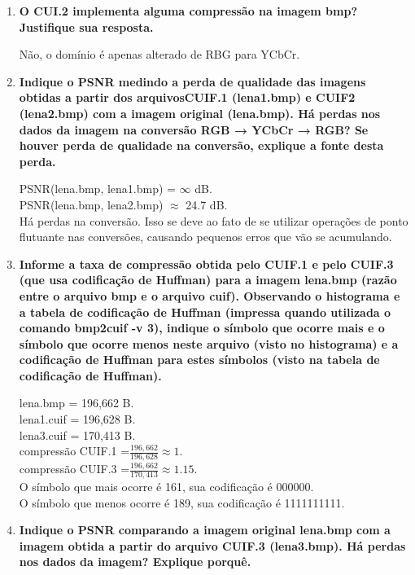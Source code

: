 \documentclass[12pt, a4paper, oneside]{abntex2}
\begin{document}
    \printcoverufsc

    \begin{enumerate}
        \item \textbf{O CUI.2 implementa alguma compressão na imagem bmp?
                Justifique sua resposta.}

                Não, o domínio é apenas alterado de RBG para YCbCr.

        \item \textbf{Indique o PSNR medindo a perda de qualidade das imagens obtidas a partir dos arquivosCUIF.1 (lena1.bmp) e CUIF2 (lena2.bmp) com a imagem original (lena.bmp).
        Há perdas nos dados da imagem na conversão RGB → YCbCr → RGB? Se houver perda de qualidade na conversão, explique a fonte desta perda.}

                PSNR(lena.bmp, lena1.bmp) = $\infty$ dB. \\
                PSNR(lena.bmp, lena2.bmp) $\approx$ 24.7 dB. \\
                Há perdas na conversão.
                Isso se deve ao fato de se utilizar operações de ponto flutuante nas conversões, causando pequenos erros que vão se acumulando.

        \item \textbf{Informe a taxa de compressão obtida pelo CUIF.1 e pelo CUIF.3 (que usa codificação de Huffman) para a imagem lena.bmp (razão entre o arquivo bmp e o arquivo cuif).
        Observando o histograma e a tabela de codificação de Huffman (impressa quando utilizada o comando bmp2cuif -v 3), indique o símbolo que ocorre mais e o símbolo que ocorre menos neste arquivo (visto no histograma) e a codificação de Huffman para estes símbolos (visto na tabela de codificação de Huffman).}

            lena.bmp = 196,662 B. \\
            lena1.cuif = 196,628 B. \\
            lena3.cuif = 170,413 B. \\
            compressão CUIF.1 =$\frac{196,662}{196,628} \approx 1$. \\
            compressão CUIF.3 =$\frac{196,662}{170,413} \approx 1.15$. \\
            O símbolo que mais ocorre é 161, sua codificação é 000000. \\
            O símbolo que menos ocorre é 189, sua codificação é 1111111111.

        \item \textbf{Indique o PSNR comparando a imagem original lena.bmp com a imagem obtida a partir do arquivo CUIF.3 (lena3.bmp).
        Há perdas nos dados da imagem?
        Explique porquê.}


\end{enumerate}
\end{document}

